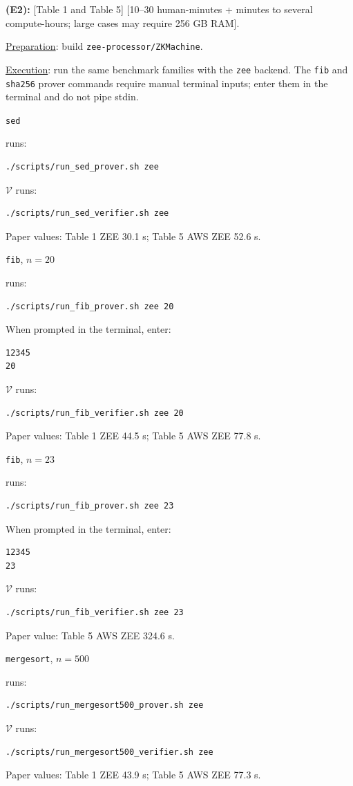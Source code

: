 \documentclass[nonacm,sigconf]{acmart}
\let\P\undefined
\newcommand{\P}{\ensuremath{\mathcal{P}}\xspace}
\newcommand{\V}{\ensuremath{\mathcal{V}}\xspace}
\begin{document}
\textbf{(E2):} [Table 1 and Table 5] [10--30 human-minutes + minutes to
several compute-hours; large cases may require 256 GB RAM].

\noindent
\underline{Preparation}: build \texttt{zee-processor/ZKMachine}.

\noindent
\underline{Execution}: run the same benchmark families with the
\texttt{zee} backend. The \texttt{fib} and \texttt{sha256} prover
commands require manual terminal inputs; enter them in the \P terminal
and do not pipe stdin.

\begin{compactitem}
\item \texttt{sed}

\P runs:
\begin{verbatim}
./scripts/run_sed_prover.sh zee
\end{verbatim}
\V runs:
\begin{verbatim}
./scripts/run_sed_verifier.sh zee
\end{verbatim}
Paper values: Table 1 ZEE 30.1 s; Table 5 AWS ZEE 52.6 s.

\item \texttt{fib}, $n=20$

\P runs:
\begin{verbatim}
./scripts/run_fib_prover.sh zee 20
\end{verbatim}
When prompted in the \P terminal, enter:
\begin{verbatim}
12345
20
\end{verbatim}
\V runs:
\begin{verbatim}
./scripts/run_fib_verifier.sh zee 20
\end{verbatim}
Paper values: Table 1 ZEE 44.5 s; Table 5 AWS ZEE 77.8 s.

\item \texttt{fib}, $n=23$

\P runs:
\begin{verbatim}
./scripts/run_fib_prover.sh zee 23
\end{verbatim}
When prompted in the \P terminal, enter:
\begin{verbatim}
12345
23
\end{verbatim}
\V runs:
\begin{verbatim}
./scripts/run_fib_verifier.sh zee 23
\end{verbatim}
Paper value: Table 5 AWS ZEE 324.6 s.

\item \texttt{mergesort}, $n=500$

\P runs:
\begin{verbatim}
./scripts/run_mergesort500_prover.sh zee
\end{verbatim}
\V runs:
\begin{verbatim}
./scripts/run_mergesort500_verifier.sh zee
\end{verbatim}
Paper values: Table 1 ZEE 43.9 s; Table 5 AWS ZEE 77.3 s.


\end{compactitem}
\end{document}
